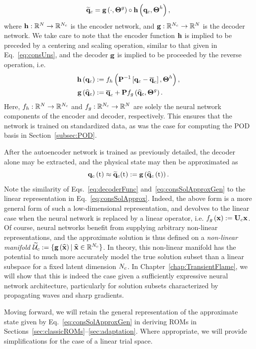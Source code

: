 %
\begin{equation}
    \mathbf{\widetilde{q}}_{c} = \mathbf{g} \left(\cdot, \boldsymbol{\Theta}^{g}\right) \circ \mathbf{h} \left(\mathbf{q}_{c}, \boldsymbol{\Theta}^{h}\right),
\end{equation}
%
where $\mathbf{h}: \mathbb{R}^{N} \rightarrow \mathbb{R}^{N_c}$ is the encoder network, and $\mathbf{g}: \mathbb{R}^{N_c} \rightarrow \mathbb{R}^{N}$ is the decoder network. We take care to note that the encoder function $\mathbf{h}$ is implied to be preceded by a centering and scaling operation, similar to that given in Eq.~\ref{eq:consUns}, and the decoder $\mathbf{g}$ is implied to be proceeded by the reverse operation, i.e.
%
\begin{align}
    \encoderFunc{\consVec} &\defEq \nnLayer_{\encoderVar} \left(\consScaleInv\left[\consVec - \consVecCent\right], \nnParams^{\encoderVar}\right), \\
    \decoderFunc{\consVecCoef} &\defEq \consVecCent + \consScale \nnLayer_{\decoderVar} \left(\consVecCoef, \nnParams^{\decoderVar}\right). \label{eq:decoderFunc}
\end{align}
%
Here, $f_{h}: \mathbb{R}^{N} \rightarrow \mathbb{R}^{N_c}$ and $f_{g}: \mathbb{R}^{N_c} \rightarrow \mathbb{R}^{N}$ are solely the neural network components of the encoder and decoder, respectively. This ensures that the network is trained on standardized data, as was the case for computing the POD basis in Section~\ref{subsec:POD}.

After the autoencoder network is trained as previously detailed, the decoder alone may be extracted, and the physical state may then be approximated as
%
\begin{equation}\label{eq:consSolApproxGen}
    \mathbf{q}_{c}\left(\text{t}\right) \approx \mathbf{\widetilde{q}}_{c}(\text{t}) := \mathbf{g} \left(\mathbf{\widehat{q}}_{c}\left(\text{t}\right)\right).
\end{equation}
%
Note the similarity of Eqs.~\ref{eq:decoderFunc} and~\ref{eq:consSolApproxGen} to the linear representation in Eq.~\ref{eq:consSolApprox}. Indeed, the above form is a more general form of such a low-dimensional representation, and devolves to the linear case when the neural network is replaced by a linear operator, i.e. $\nnLayer_{\decoderVar} \left(\nnInput\right) \defEq \consTrial \nnInput$. Of course, neural networks benefit from supplying arbitrary non-linear representations, and the approximate solution is thus defined on a \textit{non-linear manifold} $\consTrialSpace \defEq \{\decoderFunc{\nnInputCoef} \vert \; \nnInputCoef \inROne{\numConsModes} \}$. In theory, this non-linear manifold has the potential to much more accurately model the true solution subset than a linear subspace for a fixed latent dimension $N_c$. In Chapter~\ref{chap:TransientFlame}, we will show that this is indeed the case given a sufficiently expressive neural network architecture, particularly for solution subsets characterized by propagating waves and sharp gradients.

Moving forward, we will retain the general representation of the approximate state given by Eq.~\ref{eq:consSolApproxGen} in deriving ROMs in Sections~\ref{sec:classicROMs}--\ref{sec:adaptation}. Where appropriate, we will provide simplifications for the case of a linear trial space.
